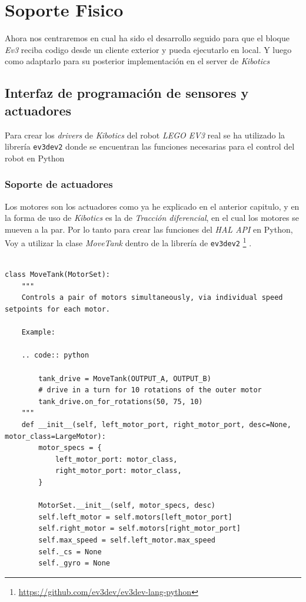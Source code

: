 \chapter{Soporte Fisico}

Ahora nos centraremos en cual ha sido el desarrollo seguido para que el bloque \textit{Ev3} reciba codigo desde un cliente exterior y pueda ejecutarlo en local. Y luego como adaptarlo para su posterior implementación en el server de \textit{Kibotics}

\section{Interfaz de programación de sensores y actuadores}
\label{sec:interfazfisico}
Para crear los \textit{drivers} de \textit{Kibotics} del robot \textit{LEGO EV3} real se ha utilizado la librería \texttt{ev3dev2} donde se encuentran las funciones necesarias para el control del robot en Python 

\subsection{Soporte de actuadores}
Los motores son los actuadores como ya he explicado en el anterior capitulo, y en la forma de uso de \textit{Kibotics} es la de \textit{Tracción diferencial}, en el cual los motores se mueven a la par. Por lo tanto para crear las funciones  del \textit{HAL API} en Python, Voy a utilizar la clase \textit{MoveTank} dentro de la librería de \texttt{ev3dev2} \footnote{\url{https://github.com/ev3dev/ev3dev-lang-python}} .
 
\begin{lstlisting}[frame=single,breaklines=true, label=Clase MoveTank caption=Clase MoveTank,  captionpos=b]

class MoveTank(MotorSet):
    """
    Controls a pair of motors simultaneously, via individual speed setpoints for each motor.

    Example:

    .. code:: python

        tank_drive = MoveTank(OUTPUT_A, OUTPUT_B)
        # drive in a turn for 10 rotations of the outer motor
        tank_drive.on_for_rotations(50, 75, 10)
    """
    def __init__(self, left_motor_port, right_motor_port, desc=None, motor_class=LargeMotor):
        motor_specs = {
            left_motor_port: motor_class,
            right_motor_port: motor_class,
        }

        MotorSet.__init__(self, motor_specs, desc)
        self.left_motor = self.motors[left_motor_port]
        self.right_motor = self.motors[right_motor_port]
        self.max_speed = self.left_motor.max_speed
        self._cs = None
        self._gyro = None
\end{lstlisting}


